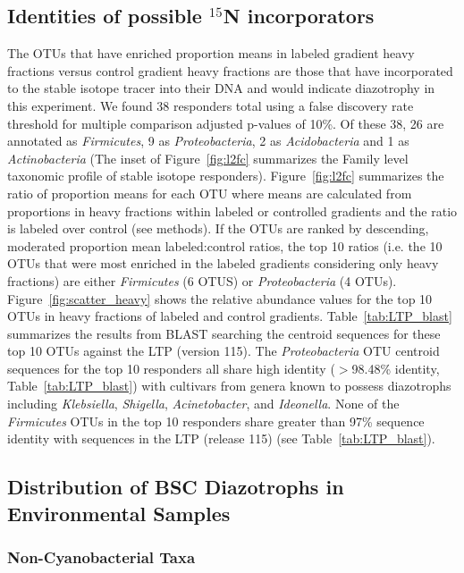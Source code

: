 \subsection{Identities of possible $^{15}$N incorporators}
The OTUs that have enriched proportion means in labeled gradient heavy
fractions versus control gradient heavy fractions are those that have
incorporated to the stable isotope tracer into their DNA and would indicate
diazotrophy in this experiment. We found 38 responders total using a false
discovery rate threshold for multiple comparison adjusted p-values of 10\%. Of
these 38, 26 are annotated as \textit{Firmicutes}, 9 as
\textit{Proteobacteria}, 2 as \textit{Acidobacteria} and 1 as
\textit{Actinobacteria} (The inset of Figure~\ref{fig:l2fc} summarizes the
Family level taxonomic profile of stable isotope responders).
Figure~\ref{fig:l2fc} summarizes the ratio of proportion means for each OTU
where means are calculated from proportions in heavy fractions within labeled
or controlled gradients and the ratio is labeled over control (see methods). If
the OTUs are ranked by descending, moderated proportion mean labeled:control
ratios, the top 10 ratios (i.e. the 10 OTUs that were most enriched in the
labeled gradients considering only heavy fractions) are either
\textit{Firmicutes} (6 OTUS) or \textit{Proteobacteria} (4 OTUs).
Figure~\ref{fig:scatter_heavy} shows the relative abundance values for the top
10 OTUs in heavy fractions of labeled and control gradients.
Table~\ref{tab:LTP_blast} summarizes the results from BLAST searching the
centroid sequences for these top 10 OTUs against the LTP (version 115). The
\textit{Proteobacteria} OTU centroid sequences for the top 10 responders all
share high identity ($>$98.48\% identity, Table~\ref{tab:LTP_blast}) with
cultivars from genera known to possess diazotrophs including
\textit{Klebsiella}, \textit{Shigella}, \textit{Acinetobacter}, and
\textit{Ideonella}. None of the \textit{Firmicutes} OTUs in the top 10
responders share greater than 97\% sequence identity with sequences in the LTP
(release 115) (see Table~\ref{tab:LTP_blast}).

\subsection{Distribution of BSC Diazotrophs in Environmental Samples}
\subsubsection{Non-Cyanobacterial Taxa}
